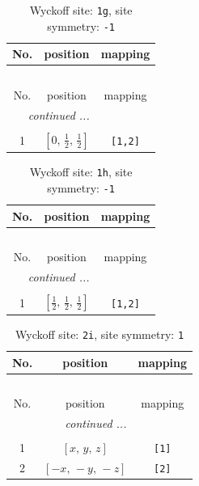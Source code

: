 \documentclass[fleqn,8pt]{jsarticle}
\begin{document}
\renewcommand{\arraystretch}{1.2}
\begin{longtable}{ccc}
\caption{Wyckoff site: {\tt 1g}, site symmetry: {\tt -1}}
 \\
 \hline \hline
No. & position & mapping \\ \hline \endfirsthead

\multicolumn{2}{l}{\tablename\ \thetable{}} \\
 \hline \hline
No. & position & mapping \\ \hline \endhead

 \hline \hline
\multicolumn{2}{r}{\footnotesize\it continued ...} \\ \endfoot

 \hline \hline
\multicolumn{2}{r}{} \\ \endlastfoot

1 & $\left[ 0,\, \frac{1}{2},\, \frac{1}{2} \right]$ & {\tt [1,2]} \\
\end{longtable}
\renewcommand{\arraystretch}{1.2}
\begin{longtable}{ccc}
\caption{Wyckoff site: {\tt 1h}, site symmetry: {\tt -1}}
 \\
 \hline \hline
No. & position & mapping \\ \hline \endfirsthead

\multicolumn{2}{l}{\tablename\ \thetable{}} \\
 \hline \hline
No. & position & mapping \\ \hline \endhead

 \hline \hline
\multicolumn{2}{r}{\footnotesize\it continued ...} \\ \endfoot

 \hline \hline
\multicolumn{2}{r}{} \\ \endlastfoot

1 & $\left[ \frac{1}{2},\, \frac{1}{2},\, \frac{1}{2} \right]$ & {\tt [1,2]} \\
\end{longtable}
\renewcommand{\arraystretch}{1.2}
\begin{longtable}{ccc}
\caption{Wyckoff site: {\tt 2i}, site symmetry: {\tt 1}}
 \\
 \hline \hline
No. & position & mapping \\ \hline \endfirsthead

\multicolumn{2}{l}{\tablename\ \thetable{}} \\
 \hline \hline
No. & position & mapping \\ \hline \endhead

 \hline \hline
\multicolumn{2}{r}{\footnotesize\it continued ...} \\ \endfoot

 \hline \hline
\multicolumn{2}{r}{} \\ \endlastfoot

1 & $\left[ x,\, y,\, z \right]$ & {\tt [1]} \\ \hline
2 & $\left[ - x,\, - y,\, - z \right]$ & {\tt [2]} \\
\end{longtable}
\end{document}
